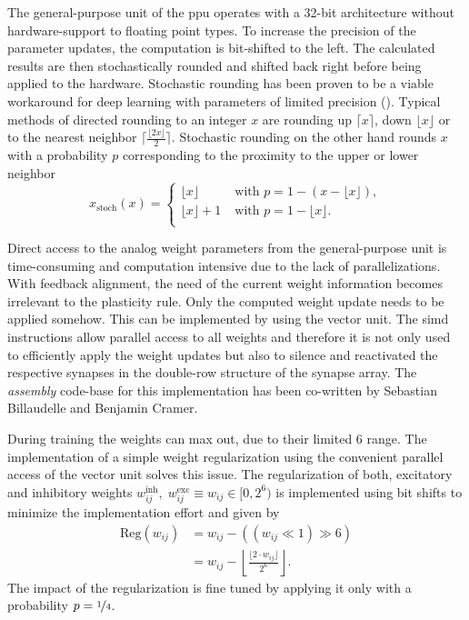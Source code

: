 The general-purpose unit of the \gls{ppu} operates with a 32-bit architecture without hardware-support to floating point types. To increase the precision of the parameter updates, the computation is bit-shifted to the left. The calculated results are then stochastically rounded and shifted back right before being applied to the hardware. Stochastic rounding has been proven to be a viable workaround for deep learning with parameters of limited precision (\citealp{limitedprecisionpaper}). Typical methods of directed rounding to an integer $x$ are rounding up $\lceil x\rceil$, down $\lfloor x\rfloor$ or to the nearest neighbor $\lceil\frac{\lfloor2x\rfloor}{2}\rceil$. Stochastic rounding on the other hand rounds $x$ with a probability $p$ corresponding to the proximity to the upper or lower neighbor
\begin{equation*}
x_\text{stoch}(x) = 
\begin{cases}
\lfloor x \rfloor \quad \quad &\text{with } p = 1 - (x - \lfloor x \rfloor), \\
\lfloor x \rfloor + 1 &\text{with } p = 1 - \lfloor x \rfloor. \\
\end{cases}
\end{equation*}

Direct access to the analog weight parameters from the general-purpose unit is time-consuming and computation intensive due to the lack of parallelizations. With feedback alignment, the need of the current weight information becomes irrelevant to the plasticity rule. Only the computed weight update needs to be applied somehow. This can be implemented by using the vector unit. The \gls{simd} instructions allow parallel access to all weights and therefore it is not only used to efficiently apply the weight updates but also to silence and reactivated the respective synapses in the double-row structure of the synapse array. The \emph{assembly} code-base for this implementation has been co-written by Sebastian Billaudelle and Benjamin Cramer.

During training the weights can max out, due to their limited \SI{6}{\bit} range. The implementation of a simple weight regularization using the convenient parallel access of the vector unit solves this issue. The regularization of both, excitatory and inhibitory weights $w_{ij}^\text{inh},\; w_{ij}^\text{exc}\equiv w_{ij} \in [0,2^6)$ is implemented using bit shifts to minimize the implementation effort and given by
\begin{align*}
\text{Reg}(w_{ij}) &= w_{ij} - \left(\left(w_{ij} \ll 1\right) \gg 6\right) \nonumber \\
&= w_{ij} - \left\lfloor \frac{\lfloor 2 \cdot w_{ij}  \rfloor}{2^{6}} \right\rfloor.					
\end{align*}
The impact of the regularization is fine tuned by applying it only with a probability $p=\nicefrac{1}{4}$.

